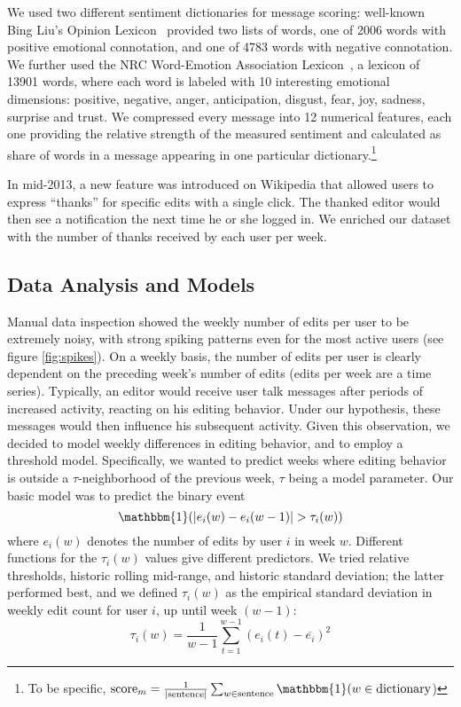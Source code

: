 \documentclass[letterpaper, 10 pt, conference]{ieeeconf}  %
\begin{document}
We used two different sentiment dictionaries for message scoring: well-known Bing Liu's Opinion Lexicon~\cite{c8} provided two lists of words, one of 2006 words with positive emotional connotation, and one of 4783 words with negative connotation. We further used the NRC Word-Emotion Association Lexicon~\cite{c9}, a lexicon of 13901 words, where each word is labeled with 10 interesting emotional dimensions: positive, negative, anger, anticipation, disgust, fear, joy, sadness, surprise and trust. We compressed every message into 12 numerical features, each one providing the relative strength of the measured sentiment and calculated as share of words in a message appearing in one particular dictionary.\footnote{To be specific, $\text{score}_m = \frac{1}{\lvert \text{sentence} \rvert } \sum_{w \in \text{sentence}} \mathbbm{1} (w \in \text{dictionary}$) 
}

In mid-2013, a new feature was introduced on Wikipedia that allowed users to express ``thanks'' for specific edits with a single click. The thanked editor would then see a notification the next time he or she logged in. We enriched our dataset with the number of thanks received by each user per week.




\subsection{Data Analysis and Models}

Manual data inspection showed the weekly number of edits per user to be extremely noisy, with strong spiking patterns even for the most active users (see figure \ref{fig:spikes}). On a weekly basis, the number of edits per user is clearly dependent on the preceding week's number of edits (edits per week are a time series). Typically, an editor would receive user talk messages after periods of increased activity, reacting on his editing behavior. Under our hypothesis, these messages would then influence his subsequent activity. Given this observation, we decided to model weekly differences in editing behavior, and to employ a threshold model. Specifically, we wanted to predict weeks where editing behavior is outside a $\tau$-neighborhood of the previous week, $\tau$ being a model parameter. Our basic model was to predict the binary event
\[
\mathbbm{1}(\lvert e_i(w) - e_i(w-1)\rvert > \tau_{i}(w))
\]
where $e_i(w)$ denotes the number of edits by user $i$ in week $w$. Different functions for the $\tau_{i}(w)$ values give different predictors. We tried relative thresholds, historic rolling mid-range, and historic standard deviation; the latter performed best, and we defined $\tau_{i}(w)$ as the empirical standard deviation in weekly edit count for user $i$, up until week $(w - 1)$:
\[
\tau_{i}(w) = \frac{1}{w-1} \sum_{t=1}^{w-1} (e_i(t) - \overline{e_i})^2
\]
\end{document}
